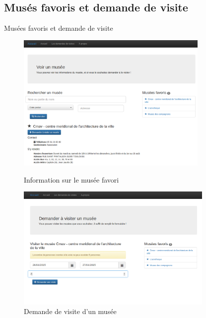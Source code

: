 \AntoineSpeak
\subsection{Mus\'es favoris et demande de visite}
\begin{frame}{Musées favoris et demande de visite}
	\begin{figure}
		\centering
		
		 { 
		\includegraphics[width=9.25cm]{screens/info_star_museum.png}
		\caption{Information sur le musée favori}
		}

		\only<3> { 
		\includegraphics[width=9.5cm]{screens/asking_visit.png}
		\caption{Demande de visite d'un musée}
		}
		

\end{figure}
\end{frame}
